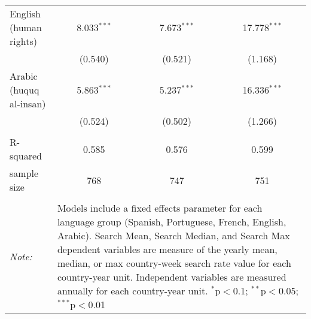 \begin{table}[!htbp]
\begin{tabular}{@{\extracolsep{5pt}}lccc}
  English (human rights) & 8.033$^{***}$ & 7.673$^{***}$ & 17.778$^{***}$ \\ 
  & (0.540) & (0.521) & (1.168) \\ 
  Arabic (huquq al-insan) & 5.863$^{***}$ & 5.237$^{***}$ & 16.336$^{***}$ \\ 
  & (0.524) & (0.502) & (1.266) \\ 
 \hline \\[-1.8ex] 
R-squared  & 0.585 & 0.576 & 0.599 \\ 
sample size  & 768 & 747 & 751 \\ 
\hline 
\hline \\[-1.8ex] 
\textit{Note:}  & \multicolumn{3}{l}{\parbox[t]{8cm}{Models include a fixed effects parameter for each language group (Spanish, Portuguese, French, English, Arabic). Search Mean, Search Median, and Search Max dependent variables are measure of the yearly mean, median, or max country-week search rate value for each country-year unit. Independent variables are measured annually for each country-year unit. $^{*}$p$<$0.1; $^{**}$p$<$0.05; $^{***}$p$<$0.01}} \\ 
\end{tabular} 
\end{table} 
